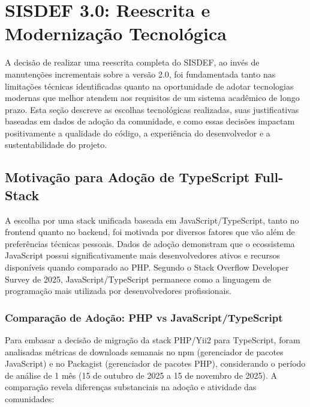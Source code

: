\documentclass[nonacm, sigconf]{acmart}
\begin{document}

\section{SISDEF 3.0: Reescrita e Modernização Tecnológica}
\label{section:sisdef_v3}

A decisão de realizar uma reescrita completa do SISDEF, ao invés de manutenções incrementais sobre a versão 2.0, foi fundamentada tanto nas limitações técnicas identificadas quanto na oportunidade de adotar tecnologias modernas que melhor atendem aos requisitos de um sistema acadêmico de longo prazo. Esta seção descreve as escolhas tecnológicas realizadas, suas justificativas baseadas em dados de adoção da comunidade, e como essas decisões impactam positivamente a qualidade do código, a experiência do desenvolvedor e a sustentabilidade do projeto.

\subsection{Motivação para Adoção de TypeScript Full-Stack}

A escolha por uma stack unificada baseada em JavaScript/TypeScript, tanto no frontend quanto no backend, foi motivada por diversos fatores que vão além de preferências técnicas pessoais. Dados de adoção demonstram que o ecossistema JavaScript possui significativamente mais desenvolvedores ativos e recursos disponíveis quando comparado ao PHP. Segundo o Stack Overflow Developer Survey de 2025, JavaScript/TypeScript permanece como a linguagem de programação mais utilizada por desenvolvedores profissionais.

\subsubsection{Comparação de Adoção: PHP vs JavaScript/TypeScript}

Para embasar a decisão de migração da stack PHP/Yii2 para TypeScript, foram analisadas métricas de downloads semanais no npm (gerenciador de pacotes JavaScript) e no Packagist (gerenciador de pacotes PHP), considerando o período de análise de 1 mês (15 de outubro de 2025 a 15 de novembro de 2025). A comparação revela diferenças substanciais na adoção e atividade das comunidades:
\end{document}
